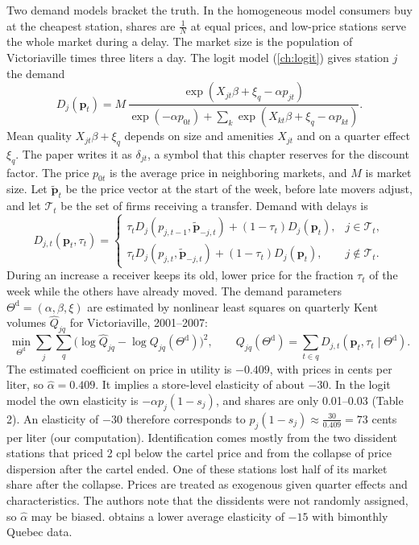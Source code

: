 Two demand models bracket the truth. In the homogeneous model consumers buy at the cheapest station, shares are $\frac{1}{N}$ at
equal prices, and low-price stations serve the whole market during a delay. The market size is the population of Victoriaville
times three liters a day. The logit model (\cref{ch:logit}) gives station $j$ the demand
\begin{equation}\label{eq:13-ch-logit}
D_j(\mathbf p_t)=M\,\frac{\exp(X_{jt}\beta+\xi_{q}-\alpha p_{jt})}{\exp(-\alpha p_{0t})+\sum_k\exp(X_{kt}\beta+\xi_{q}-\alpha p_{kt})}.
\end{equation}
Mean quality $X_{jt}\beta+\xi_q$ depends on size and amenities $X_{jt}$ and on a quarter effect $\xi_q$. The paper writes it as
$\delta_{jt}$, a symbol that this chapter reserves for the discount factor. The price $p_{0t}$ is the average price in neighboring
markets, and $M$ is market size. Let $\tilde{\mathbf p}_t$ be the price vector at the start of the week, before
late movers adjust, and let $\mathcal T_t$ be the set of firms receiving a transfer. Demand with delays is
\begin{equation}\label{eq:13-ch-delay}
D_{j,t}(\mathbf p_t,\tau_t)=\begin{cases}\tau_tD_j(p_{j,t-1},\tilde{\mathbf p}_{-j,t})+(1-\tau_t)D_j(\mathbf p_t), & j\in\mathcal T_t,\\
\tau_tD_j(p_{j,t},\tilde{\mathbf p}_{-j,t})+(1-\tau_t)D_j(\mathbf p_t), & j\notin\mathcal T_t.\end{cases}
\end{equation}
During an increase a receiver keeps its old, lower price for the fraction $\tau_t$ of the week while the others have already
moved. The demand parameters $\Theta^{\mathrm d}=(\alpha,\beta,\xi)$ are estimated by nonlinear least squares on quarterly Kent
volumes $\hat Q_{jq}$ for Victoriaville, 2001--2007:
\begin{equation}\label{eq:13-ch-nls}
\min_{\Theta^{\mathrm d}}\sum_j\sum_q\Big(\log\hat Q_{jq}-\log Q_{jq}(\Theta^{\mathrm d})\Big)^2,\qquad
Q_{jq}(\Theta^{\mathrm d})=\sum_{t\in q}D_{j,t}(\mathbf p_t,\tau_t\mid\Theta^{\mathrm d}).
\end{equation}
The estimated coefficient on price in utility is $-0.409$, with prices in cents per liter, so $\hat\alpha=0.409$. It implies a
store-level elasticity of about $-30$. In the logit model the own elasticity is $-\alpha p_j(1-s_j)$, and shares are only
0.01--0.03 (Table 2). An elasticity of $-30$ therefore corresponds to $p_j(1-s_j)\approx\frac{30}{0.409}=73$ cents per liter
(our computation). Identification comes mostly from the two
dissident stations that priced 2 cpl below the cartel price and from the collapse of price dispersion after the cartel ended. One
of these stations lost half of its market share after the collapse. Prices are treated as exogenous given quarter effects and
characteristics. The authors note that the dissidents were not randomly assigned, so $\hat\alpha$ may be biased.
\citet{Houde2012} obtains a lower average elasticity of $-15$ with bimonthly Quebec data.

